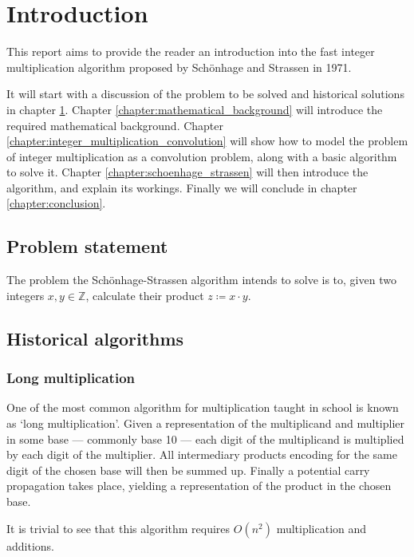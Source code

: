 \chapter{Introduction}
\label{chapter:introduction}

This report aims to provide the reader an introduction into the fast integer
multiplication algorithm proposed by Schönhage and Strassen in 1971.
\autocite{schonhageSchnelleMultiplikationGrosser1971}

It will start with a discussion of the problem to be solved and historical
solutions in chapter \ref{chapter:introduction}. Chapter
\ref{chapter:mathematical_background} will introduce the required mathematical
background. Chapter \ref{chapter:integer_multiplication_convolution} will show
how to model the problem of integer multiplication as a convolution problem,
along with a basic algorithm to solve it. Chapter
\ref{chapter:schoenhage_strassen} will then introduce the algorithm,
and explain its workings. Finally we will conclude in chapter
\ref{chapter:conclusion}.

\section{Problem statement}

The problem the Schönhage-Strassen algorithm intends to solve is to, given two
integers $x, y \in \mathbb{Z}$, calculate their product $z \coloneqq x \cdot
y$.

\section{Historical algorithms}

\subsection{Long multiplication}

One of the most common algorithm for multiplication taught in school is known
as `long multiplication'. Given a representation of the multiplicand and
multiplier in some base --- commonly base 10 --- each digit of the multiplicand
is multiplied by each digit of the multiplier. All intermediary products
encoding for the same digit of the chosen base will then be summed up. Finally
a potential carry propagation takes place, yielding a representation of the
product in the chosen base.

It is trivial to see that this algorithm requires $O(n^2)$ multiplication and additions.

